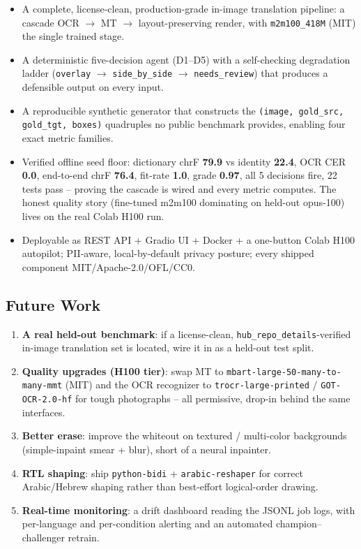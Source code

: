 \documentclass[12pt,a4paper]{article}
\begin{document}
\begin{itemize}\setlength\itemsep{0.15em}
  \item A complete, license-clean, production-grade in-image translation pipeline: a cascade OCR $\rightarrow$ MT $\rightarrow$ layout-preserving render, with \texttt{m2m100\_418M} (MIT) the single trained stage.
  \item A deterministic five-decision agent (D1--D5) with a self-checking degradation ladder (\texttt{overlay} $\rightarrow$ \texttt{side\_by\_side} $\rightarrow$ \texttt{needs\_review}) that produces a defensible output on every input.
  \item A reproducible synthetic generator that constructs the \texttt{(image, gold\_src, gold\_tgt, boxes)} quadruples no public benchmark provides, enabling four exact metric families.
  \item Verified offline seed floor: dictionary chrF \textbf{79.9} vs identity \textbf{22.4}, OCR CER \textbf{0.0}, end-to-end chrF \textbf{76.4}, fit-rate \textbf{1.0}, grade \textbf{0.97}, all 5 decisions fire, 22 tests pass -- proving the cascade is wired and every metric computes. The honest quality story (fine-tuned m2m100 dominating on held-out opus-100) lives on the real Colab H100 run.
  \item Deployable as REST API + Gradio UI + Docker + a one-button Colab H100 autopilot; PII-aware, local-by-default privacy posture; every shipped component MIT/Apache-2.0/OFL/CC0.
\end{itemize}

\subsection{Future Work}

\begin{enumerate}\setlength\itemsep{0.15em}
  \item \textbf{A real held-out benchmark}: if a license-clean, \texttt{hub\_repo\_details}-verified in-image translation set is located, wire it in as a held-out test split.
  \item \textbf{Quality upgrades (H100 tier)}: swap MT to \texttt{mbart-large-50-many-to-many-mmt} (MIT) and the OCR recognizer to \texttt{trocr-large-printed} / \texttt{GOT-OCR-2.0-hf} for tough photographs -- all permissive, drop-in behind the same interfaces.
  \item \textbf{Better erase}: improve the whiteout on textured / multi-color backgrounds (simple-inpaint smear + blur), short of a neural inpainter.
  \item \textbf{RTL shaping}: ship \texttt{python-bidi} + \texttt{arabic-reshaper} for correct Arabic/Hebrew shaping rather than best-effort logical-order drawing.
  \item \textbf{Real-time monitoring}: a drift dashboard reading the JSONL job logs, with per-language and per-condition alerting and an automated champion--challenger retrain.
\end{enumerate}
\end{document}
